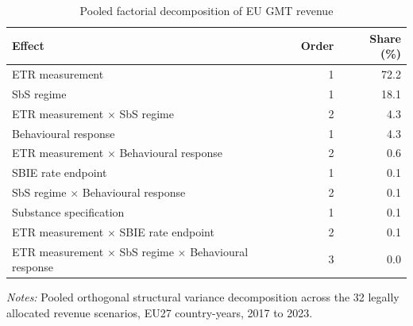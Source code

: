 \begin{table}[H]
\centering
\small
\setlength{\tabcolsep}{4pt}
\caption[Pooled factorial decomposition of EU GMT revenue]{Pooled factorial decomposition of EU GMT revenue}
\label{tab:stage4_6_anova_updated}
\begin{tabular}{@{}lrr@{}}
\toprule
Effect & Order & Share (\%) \\
\midrule
ETR measurement & 1 & 72.2 \\
SbS regime & 1 & 18.1 \\
ETR measurement $\times$ SbS regime & 2 &  4.3 \\
Behavioural response & 1 &  4.3 \\
ETR measurement $\times$ Behavioural response & 2 &  0.6 \\
SBIE rate endpoint & 1 &  0.1 \\
SbS regime $\times$ Behavioural response & 2 &  0.1 \\
Substance specification & 1 &  0.1 \\
ETR measurement $\times$ SBIE rate endpoint & 2 &  0.1 \\
ETR measurement $\times$ SbS regime $\times$ Behavioural response & 3 &  0.0 \\
\bottomrule
\end{tabular}

\vspace{0.35em}
\noindent\begin{minipage}{\textwidth}
\footnotesize\raggedright\textit{Notes:} Pooled orthogonal structural variance decomposition across the 32 legally allocated revenue scenarios, EU27 country-years, 2017 to 2023.
\end{minipage}
\end{table}
